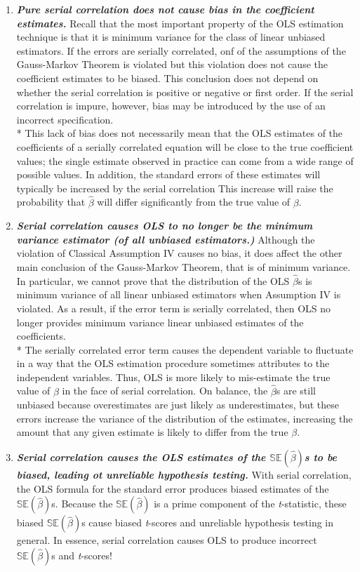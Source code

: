 \documentclass[11pt]{article}
\begin{document}
\begin{enumerate}
\item \textit{\textbf{Pure serial correlation does not cause bias in the coefficient estimates.}} Recall that the most important property of the OLS estimation technique is that it is minimum variance for the class of linear unbiased estimators. If the errors are serially correlated, onf of the assumptions of the Gauss-Markov Theorem is violated but this violation does not cause the coefficient estimates to be biased. This conclusion does not depend on whether the serial correlation is positive or negative or first order. If the serial correlation is impure, however, bias may be introduced by the use of an incorrect specification. \\*
This lack of bias does not necessarily mean that the OLS estimates of the coefficients of a serially correlated equation will be close to the true coefficient values; the single estimate observed in practice can come from a wide range of possible values. In addition, the standard errors of these estimates will typically be increased by the serial correlation This increase will raise the probability that $\hat{\beta}$ will differ significantly from the true value of $\beta$.
\item \textit{\textbf{Serial correlation causes OLS to no longer be the minimum variance estimator (of all unbiased estimators.)}} Although the violation of Classical Assumption IV causes no bias, it does affect the other main conclusion of the Gauss-Markov Theorem, that is of minimum variance. In particular, we cannot prove that the distribution of the OLS $\hat{\beta}$s is minimum variance of all linear unbiased estimators when Assumption IV is violated. As a result, if the error term is serially correlated, then OLS no longer provides minimum variance linear unbiased estimates of the coefficients. \\*
The serially correlated error term causes the dependent variable to fluctuate in a way that the OLS estimation procedure sometimes attributes to the independent variables. Thus, OLS is more likely to mis-estimate the true value of $\beta$ in the face of serial correlation. On balance, the $\hat{\beta}$s are still unbiased because overestimates are just likely as underestimates, but these errors increase the variance of the distribution of the estimates, increasing the amount that any given estimate is likely to differ from the true $\beta$.
\item \textbf{\textit{Serial correlation causes the OLS estimates of the $\mathbb{SE}(\hat{\beta})$s to be biased, leading ot unreliable hypothesis testing.}} With serial correlation, the OLS formula for the standard error produces biased estimates of the $\mathbb{SE}(\hat{\beta})$s. Because the $\mathbb{SE}(\hat{\beta})$ is a prime component of the \textit{t}-statistic, these biased $\mathbb{SE}(\hat{\beta})$s cause biased \textit{t}-scores and unreliable hypothesis testing in general. In essence, serial correlation causes OLS to produce incorrect $\mathbb{SE}(\hat{\beta})$s and \textit{t}-scores!\\

\end{enumerate}
\end{document}
